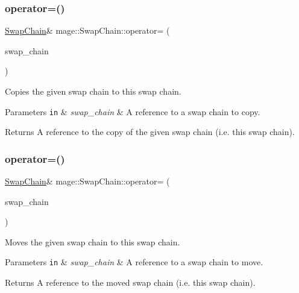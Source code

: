 \subsubsection{\texorpdfstring{operator=()}{operator=()}\hspace{0.1cm}{\footnotesize\ttfamily [1/2]}}
{\footnotesize\ttfamily \hyperlink{classmage_1_1_swap_chain}{Swap\+Chain}\& mage\+::\+Swap\+Chain\+::operator= (\begin{DoxyParamCaption}\item[{const \hyperlink{classmage_1_1_swap_chain}{Swap\+Chain} \&}]{swap\+\_\+chain }\end{DoxyParamCaption})\hspace{0.3cm}{\ttfamily [delete]}}

Copies the given swap chain to this swap chain.


\begin{DoxyParams}[1]{Parameters}
\mbox{\tt in}  & {\em swap\+\_\+chain} & A reference to a swap chain to copy. \\
\hline
\end{DoxyParams}
\begin{DoxyReturn}{Returns}
A reference to the copy of the given swap chain (i.\+e. this swap chain). 
\end{DoxyReturn}
\hypertarget{classmage_1_1_swap_chain_a4335d4e0869c43a66bfce5f2d0d6f34c}{}\label{classmage_1_1_swap_chain_a4335d4e0869c43a66bfce5f2d0d6f34c} 
\subsubsection{\texorpdfstring{operator=()}{operator=()}\hspace{0.1cm}{\footnotesize\ttfamily [2/2]}}
{\footnotesize\ttfamily \hyperlink{classmage_1_1_swap_chain}{Swap\+Chain}\& mage\+::\+Swap\+Chain\+::operator= (\begin{DoxyParamCaption}\item[{\hyperlink{classmage_1_1_swap_chain}{Swap\+Chain} \&\&}]{swap\+\_\+chain }\end{DoxyParamCaption})\hspace{0.3cm}{\ttfamily [delete]}}

Moves the given swap chain to this swap chain.


\begin{DoxyParams}[1]{Parameters}
\mbox{\tt in}  & {\em swap\+\_\+chain} & A reference to a swap chain to move. \\
\hline
\end{DoxyParams}
\begin{DoxyReturn}{Returns}
A reference to the moved swap chain (i.\+e. this swap chain). 
\end{DoxyReturn}
\hypertarget{classmage_1_1_swap_chain_a477d34baf72331aeff23f32cd34518b6}{}\label{classmage_1_1_swap_chain_a477d34baf72331aeff23f32cd34518b6} 
